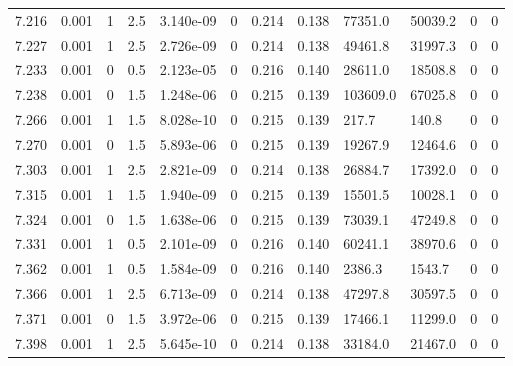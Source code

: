\documentclass[preview]{standalone}
\begin{document}
{{{{{{{{{{{{\begin{tabular}{L{1.2cm}C{1.2cm} C{0.3cm}C{0.5cm} C{1.4cm}C{1.4cm} C{1.4cm}C{1.4cm} C{1.6cm}C{1.6cm} C{1.6cm}C{1.6cm}}
  7.216  &  0.001  & 1     & 2.5 &  3.140e-09  & 0  &  0.214&   0.138& 77351.0 & 50039.2   &  0 & 0  \\ 
  7.227  &  0.001  & 1     & 2.5 &  2.726e-09  & 0  &  0.214&   0.138& 49461.8 & 31997.3   &  0 & 0  \\ 
  7.233  &  0.001  & 0     & 0.5 &  2.123e-05  & 0  &  0.216&   0.140& 28611.0 & 18508.8   &  0 & 0  \\ 
  7.238  &  0.001  & 0     & 1.5 &  1.248e-06  & 0  &  0.215&   0.139& 103609.0 & 67025.8   &  0 & 0  \\ 
  7.266  &  0.001  & 1     & 1.5 &  8.028e-10  & 0  &  0.215&   0.139& 217.7 & 140.8   &  0 & 0  \\ 
  7.270  &  0.001  & 0     & 1.5 &  5.893e-06  & 0  &  0.215&   0.139& 19267.9 & 12464.6   &  0 & 0  \\ 
  7.303  &  0.001  & 1     & 2.5 &  2.821e-09  & 0  &  0.214&   0.138& 26884.7 & 17392.0   &  0 & 0  \\ 
  7.315  &  0.001  & 1     & 1.5 &  1.940e-09  & 0  &  0.215&   0.139& 15501.5 & 10028.1   &  0 & 0  \\ 
  7.324  &  0.001  & 0     & 1.5 &  1.638e-06  & 0  &  0.215&   0.139& 73039.1 & 47249.8   &  0 & 0  \\ 
  7.331  &  0.001  & 1     & 0.5 &  2.101e-09  & 0  &  0.216&   0.140& 60241.1 & 38970.6   &  0 & 0  \\ 
  7.362  &  0.001  & 1     & 0.5 &  1.584e-09  & 0  &  0.216&   0.140& 2386.3 & 1543.7   &  0 & 0  \\ 
  7.366  &  0.001  & 1     & 2.5 &  6.713e-09  & 0  &  0.214&   0.138& 47297.8 & 30597.5   &  0 & 0  \\ 
  7.371  &  0.001  & 0     & 1.5 &  3.972e-06  & 0  &  0.215&   0.139& 17466.1 & 11299.0   &  0 & 0  \\ 
  7.398  &  0.001  & 1     & 2.5 &  5.645e-10  & 0  &  0.214&   0.138& 33184.0 & 21467.0   &  0 & 0  \\ 
\hline 
\end{tabular} 

}}}}}}}}}}}}
\end{document}

